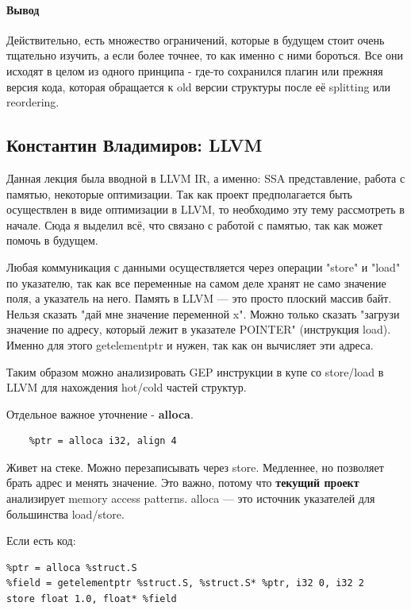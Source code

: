 \documentclass[a4paper,12pt]{article}
\begin{document}
\paragraph{Вывод}
Действительно, есть множество ограничений, которые в будущем стоит очень
тщательно изучить, а если более точнее, то как именно с ними бороться. Все они
исходят в целом из одного принципа - где-то сохранился плагин или прежняя версия
кода, которая обращается к old версии структуры после её splitting или reordering.

\subsection{Константин Владимиров: LLVM}

Данная лекция была вводной в LLVM IR, а именно: SSA представление, работа с
памятью, некоторые оптимизации. Так как проект предполагается быть осуществлен в
виде оптимизации в LLVM, то необходимо эту тему рассмотреть в начале. Сюда я
выделил всё, что связано с работой с памятью, так как может помочь в будущем.

Любая коммуникация с данными осуществляется через операции "store" и "load" по
указателю, так как все переменные на самом деле хранят не само значение поля, а
указатель на него. Память в LLVM — это просто плоский массив байт. Нельзя сказать "дай
мне значение переменной x". Можно только сказать "загрузи значение по адресу, 
который лежит в указателе POINTER" (инструкция load). Именно для этого getelementptr 
и нужен, так как он вычисляет эти адреса.

Таким образом можно анализировать GEP инструкции в купе со store/load 
в LLVM для нахождения hot/cold частей структур. 

Отдельное важное уточнение - \textbf{alloca}.
\begin{lstlisting}
    %ptr = alloca i32, align 4
\end{lstlisting}

Живет на стеке. Можно перезаписывать через store. Медленнее, но позволяет брать
адрес и менять значение. Это важно, потому что \textbf{текущий проект} анализирует 
memory access patterns. alloca — это источник указателей для большинства load/store.

Если есть код:
\begin{lstlisting}
%ptr = alloca %struct.S
%field = getelementptr %struct.S, %struct.S* %ptr, i32 0, i32 2
store float 1.0, float* %field
\end{lstlisting}
\end{document}
